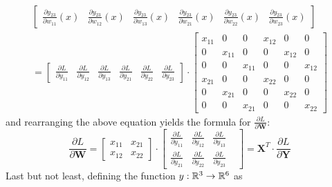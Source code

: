 \documentclass{article}
\begin{document}
\begin{align*}
\begin{bmatrix}
            \frac{\partial y_{23}}{\partial w_{11}}(x) & \frac{\partial y_{23}}{\partial w_{12}}(x) &
            \frac{\partial y_{23}}{\partial w_{13}}(x) & \frac{\partial y_{23}}{\partial w_{21}}(x) &
            \frac{\partial y_{23}}{\partial w_{22}}(x) & \frac{\partial y_{23}}{\partial w_{23}}(x)
        \end{bmatrix} \\ =
        \begin{bmatrix}
            \frac{\partial L}{\partial y_{11}} & \frac{\partial L}{\partial y_{12}} & 
            \frac{\partial L}{\partial y_{13}} & \frac{\partial L}{\partial y_{21}} & 
            \frac{\partial L}{\partial y_{22}} & \frac{\partial L}{\partial y_{23}}
        \end{bmatrix} \cdot
        \begin{bmatrix}
            x_{11} & 0 & 0 & x_{12} & 0 & 0 \\
            0 & x_{11} & 0 & 0 & x_{12} & 0 \\
            0 & 0 & x_{11} & 0 & 0 & x_{12} \\
            x_{21} & 0 & 0 & x_{22} & 0 & 0 \\
            0 & x_{21} & 0 & 0 & x_{22} & 0 \\
            0 & 0 & x_{21} & 0 & 0 & x_{22}
        \end{bmatrix}
\end{align*}
and rearranging the above equation yields the formula for $\frac{\partial L}{\partial \mathbf{W}}$:
\[
    \frac{\partial L}{\partial \mathbf{W}} =
    \begin{bmatrix}
        x_{11} & x_{21} \\
        x_{12} & x_{22}
    \end{bmatrix} \cdot
    \begin{bmatrix}
        \frac{\partial L}{\partial y_{11}} & \frac{\partial L}{\partial y_{12}} &
        \frac{\partial L}{\partial y_{13}} & \\
        \frac{\partial L}{\partial y_{21}} & \frac{\partial L}{\partial y_{22}} & 
        \frac{\partial L}{\partial y_{23}}
    \end{bmatrix} = 
    \mathbf{X}^T \cdot \frac{\partial L}{\partial \mathbf{Y}}
\]
Last but not least, defining the function \(y: \mathbb{R}^{3} \rightarrow \mathbb{R}^{6}\) as
\end{document}
